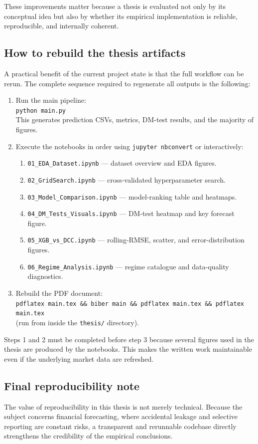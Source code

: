 These improvements matter because a thesis is evaluated not only by its conceptual idea but also by whether its empirical implementation is reliable, reproducible, and internally coherent.

\subsection{How to rebuild the thesis artifacts}

A practical benefit of the current project state is that the full workflow can be rerun.
The complete sequence required to regenerate all outputs is the following:

\begin{enumerate}
    \item Run the main pipeline:\\
          \texttt{python main.py}\\
          This generates prediction CSVs, metrics, DM-test results, and the majority of figures.
    \item Execute the notebooks in order using \texttt{jupyter nbconvert} or interactively:
    \begin{enumerate}
        \item \texttt{01\_EDA\_Dataset.ipynb} — dataset overview and EDA figures.
        \item \texttt{02\_GridSearch.ipynb} — cross-validated hyperparameter search.
        \item \texttt{03\_Model\_Comparison.ipynb} — model-ranking table and heatmaps.
        \item \texttt{04\_DM\_Tests\_Visuals.ipynb} — DM-test heatmap and key forecast figure.
        \item \texttt{05\_XGB\_vs\_DCC.ipynb} — rolling-RMSE, scatter, and error-distribution figures.
        \item \texttt{06\_Regime\_Analysis.ipynb} — regime catalogue and data-quality diagnostics.
    \end{enumerate}
    \item Rebuild the PDF document:\\
          \texttt{pdflatex main.tex \&\& biber main \&\& pdflatex main.tex \&\& pdflatex main.tex}\\
          (run from inside the \texttt{thesis/} directory).
\end{enumerate}

Steps 1 and 2 must be completed before step 3 because several figures used in the thesis are produced by the notebooks. This makes the written work maintainable even if the underlying market data are refreshed.

\subsection{Final reproducibility note}

The value of reproducibility in this thesis is not merely technical. Because the subject concerns financial forecasting, where accidental leakage and selective reporting are constant risks, a transparent and rerunnable codebase directly strengthens the credibility of the empirical conclusions.
